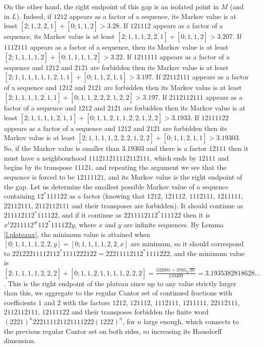 \documentclass[10pt]{amsart}
\numberwithin{equation}{section}
\theoremstyle{definition}
\begin{document}
On the other hand, the right endpoint of this gap is an isolated point in $M$ (and in $L$). Indeed, if $1212$ appears as a factor of a sequence, its Markov value is at least $[2;1,2,\overline{2,1}]+[0;1,\overline{1,2}]>3.28$. If $121112$ appears as a factor of a sequence, its Markov value is at least $[2;1,1,1,2,\overline{2,1}]+[0;1,\overline{1,2}]>3.207$. If $1112111$ appears as a factor of a sequence, then its Markov value is at least $[2;1,1,1,\overline{1,2}]+[0;1,1,1,\overline{1,2}]>3.22$. If $1211111$ appears as a factor of a sequence and $1212$ and $2121$ are forbidden then its Markov value is at least $[2;1,1,1,1,1,\overline{1,2,1,1}]+[0;1,\overline{1,2,1,1}]>3.197$. If $22112111$ appears as a factor of a sequence and $1212$ and $2121$ are forbidden then its Markov value is at least $[2;1,1,1,\overline{1,2,1,1}]+[0;1,1,2,2,\overline{2,1,2,2}]>3.197$. If $2112112111$ appears as a factor of a sequence and $1212$ and $2121$ are forbidden then its Markov value is at least $[2;1,1,1,\overline{1,2,1,1}]+[0;1,1,2,1,1,2,\overline{2,1,2,2}]>3.1933$. If $12111122$ appears as a factor of a sequence and $1212$ and $2121$ are forbidden then its Markov value is at least $[2;1,1,1,1,2,2,\overline{2,1,2,2}]+[0;1,\overline{1,2,1,1}]>3.19303$. So, if the Markov value is smaller than $3.19303$ and there is a factor $12111$ then it must have a neighbourhood $111211211112112111$, which ends by $12111$ and begins by its transpose $11121$, and repeating the argument we see that the sequence is forced to be $\overline{12111121}$, and its Markov value is the right endpoint of the gap. Let us determine the smallest possible Markov value of a sequence containing $12^*111122$ as a factor (knowing that $1212$, $121112$, $1112111$, $1211111$, $22112111$, $2112112111$ and their transposes are forbidden). It should continue as $211112112^*111122$, and if it continue as $2211112112^*111122$ then it is $x^{t}2211112^{\#}112^*111122y$, where $x$ and $y$ are infinite sequences. By Lemma \ref{l.plateaux}, the minimum value is attained when $[0;1,1,1,1,2,2,y]=[0;1,1,1,1,2,2,x]$ are minimum, so it should correspond to $\overline{2212}2211112112^*111122\overline{2122}=\overline{2221}1112112^*111\overline{1222}$, and the minimum value is $[2;1,1,1,\overline{1,2,2,2}]+[0;1,1,2,1,1,1,\overline{1,2,2,2}]=\frac{332001+3760\sqrt{30}}{110409}=3.1935382818628...$. This is the right endpoint of the plateau since up to any value strictly larger than this, we aggregate to the regular Cantor set of continued fractions with coefficients $1$ and $2$ with the factors $1212$, $121112$, $1112111$, $1211111$, $22112111$, $2112112111$, $12111122$ and their transposes forbidden the finite word $(2221)^n 222111121121111222 (1222)^n$, for $n$ large enough, which connects to the previous regular Cantor set on both sides, so increasing its Hausdorff dimension.
\end{document}
